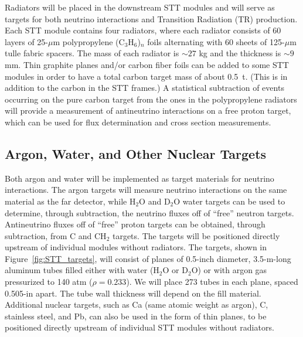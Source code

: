 Radiators will be placed in the downstream STT modules
and will serve as targets for both neutrino interactions 
and Transition Radiation (TR) production. Each STT module contains 
four radiators, where each radiator consists of
60 layers of 25-$\mu$m polypropylene (C$_3$H$_6$)$_n$ 
foils alternating with 60 sheets of 125-$\mu$m tulle fabric spacers. 
The mass of each radiator is $\sim27$ kg and the thickness is 
$\sim9$ mm. %
Thin graphite planes and/or carbon fiber foils can be added to some STT modules
in order to have a total carbon target mass of about 0.5~t. (This is in addition to
the carbon in the STT frames.) A statistical subtraction of events occurring
on the pure carbon target from the ones in the polypropylene radiators will provide a measurement of
antineutrino interactions on a free proton target, which can be used for flux determination and cross
section measurements.

\subsection{Argon, Water, and Other Nuclear Targets}

Both argon
and water will be implemented as target materials for neutrino interactions.
The argon targets will measure neutrino interactions on the same material as the far detector, while
H$_2$O and D$_2$O water targets can be used to determine, through subtraction, the
neutrino fluxes off of ``free'' neutron targets. Antineutrino fluxes off of ``free''
proton targets can be obtained, through subtraction, from C and CH$_2$ targets.
The targets will be 
positioned directly upstream of individual modules without radiators. 
The targets, shown in 
Figure~\ref{fig:STT_targets}, will consist of planes of 0.5-inch diameter, 3.5-m-long aluminum tubes filled
either with water (H$_2$O or D$_2$O) or with argon gas pressurized to 140 atm ($\rho = 0.233$). 
We will place 273 tubes in each 
plane, spaced 0.505-in apart. The tube wall thickness will depend on the fill material.
Additional nuclear targets, such as Ca (same atomic weight as argon), C, stainless
steel, and Pb, can also be used in
the form of thin planes, to be positioned directly upstream of individual STT modules without radiators.


